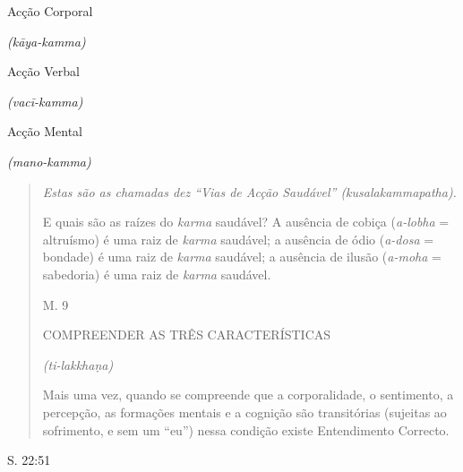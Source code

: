 Acção Corporal

\emph{(kāya-kamma)}

Acção Verbal

\emph{(vacī-kamma)}

Acção Mental

\emph{(mano-kamma)}

\begin{quote}
\emph{Estas são as chamadas dez ``Vias de Acção Saudável'' (kusalakammapatha).}

E quais são as raízes do \emph{karma} saudável? A ausência de cobiça (\emph{a-lobha} = altruísmo) é uma raiz de \emph{karma} saudável; a ausência de ódio (\emph{a-dosa} = bondade) é uma raiz de \emph{karma} saudável; a ausência de ilusão (\emph{a-moha} = sabedoria) é uma raiz de \emph{karma} saudável.

M. 9

COMPREENDER AS TRÊS CARACTERÍSTICAS

\emph{(ti-lakkhaṇa)}

Mais uma vez, quando se compreende que a corporalidade, o sentimento, a percepção, as formações mentais e a cognição são transitórias (sujeitas ao sofrimento, e sem um ``eu'') nessa condição existe Entendimento Correcto.
\end{quote}

S. 22:51

